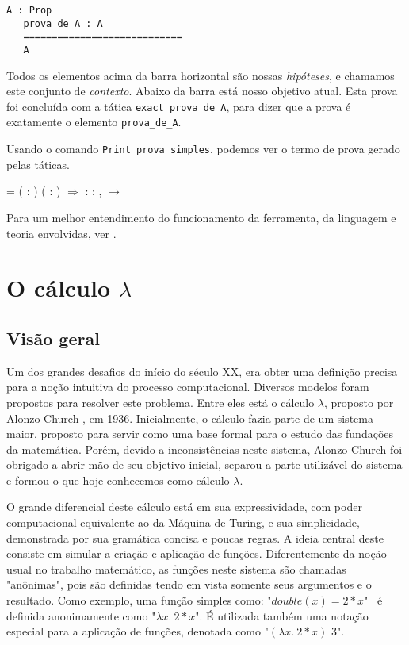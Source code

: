 \begin{lstlisting}[basicstyle=\small]
   A : Prop
   prova_de_A : A
   ============================
   A
\end{lstlisting}

Todos os elementos acima da barra horizontal são nossas \emph{hipóteses}, e
chamamos este conjunto de \emph{contexto}. Abaixo da barra está nosso objetivo
atual. Esta prova foi concluída com a tática \texttt{exact prova\_de\_A}, para
dizer que a prova é exatamente o elemento \texttt{prova\_de\_A}. 

Usando o comando \texttt{Print prova\_simples}, podemos ver o termo de prova
gerado pelas táticas.

\coqdocnoindent
{} =  ( : )
( : ) \ensuremath{\Rightarrow}
 : \coqdoceol 
\coqdocindent{2.00em} \coqdockw{\ensuremath{\forall}}  :
,  \ensuremath{\rightarrow} \coqdoceol
\bigskip

Para um melhor entendimento do funcionamento da ferramenta, da linguagem e
teoria envolvidas, ver \cite{pierce}.


\section{O cálculo $\lambda$}

\subsection{Visão geral}

Um dos grandes desafios do início do século XX, era obter uma definição 
precisa para a noção intuitiva do processo computacional. Diversos modelos foram
propostos para resolver este problema. Entre eles está o cálculo $\lambda$,
proposto por Alonzo Church \cite{lambda_first}, em 1936. Inicialmente, o cálculo
fazia parte de um sistema maior, proposto para servir como uma base
formal para o estudo das fundações da matemática. Porém, devido a
inconsistências neste sistema, Alonzo Church foi obrigado a abrir mão de seu
objetivo inicial, separou a parte utilizável do sistema e formou o que hoje
conhecemos como cálculo $\lambda$.

O grande diferencial deste cálculo está em sua expressividade, com poder
computacional equivalente ao da Máquina de Turing, e sua simplicidade,
demonstrada por sua gramática concisa e poucas regras. A ideia central deste
consiste em simular a criação e aplicação de funções. Diferentemente da noção
usual no trabalho matemático, as funções neste sistema são chamadas "anônimas",
pois são definidas tendo em vista somente seus argumentos e o resultado. Como
exemplo, uma função simples como: "$double(x) = 2*x$" \ é definida anonimamente como
"$\lambda x.\ 2*x$". É utilizada também uma notação especial para a aplicação de
funções, denotada como "$ (\lambda x.\ 2*x)$  $3$".

